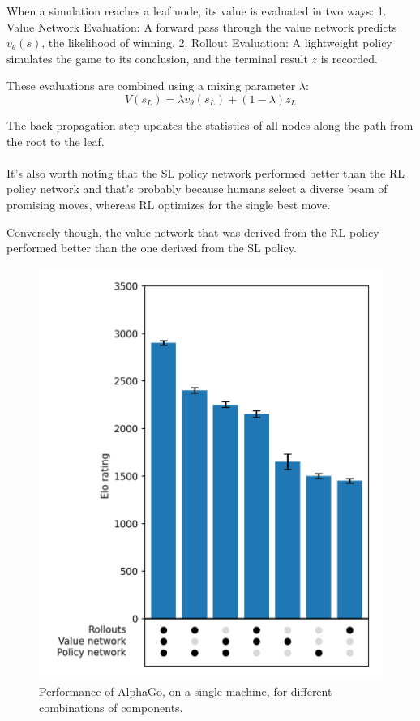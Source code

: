 When a simulation reaches a leaf node, its value is evaluated in two ways: 1.
Value Network Evaluation: A forward pass through the value network predicts \(
v_\theta(s) \), the likelihood of winning. 2. Rollout Evaluation: A lightweight
policy simulates the game to its conclusion, and the terminal result \( z \) is
recorded.

These evaluations are combined using a mixing parameter \( \lambda \):
\begin{equation}
    V(s_L) = \lambda v_\theta(s_L) + (1 - \lambda) z_L
\end{equation}

The back propagation step updates the statistics of all nodes along the path
from the root to the leaf. \\\\ It's also worth noting that the SL policy
network performed better than the RL policy network and that's probably because
humans select a diverse beam of promising moves, whereas RL optimizes for the
single best move.

Conversely though, the value network that was derived from the RL policy
performed better than the one derived from the SL policy.
\begin{figure}[htbp]
    \centering
    \includegraphics[height=1.0\linewidth, keepaspectratio]{sections/4AlphaGo/innovation.png}
    \caption{Performance of AlphaGo, on a single machine, for different
combinations of components.}
\end{figure}

